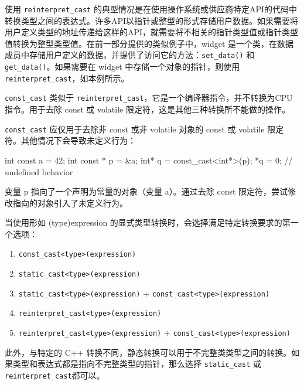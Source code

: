 使用 \verb|reinterpret_cast| 的典型情况是在使用操作系统或供应商特定API的代码中转换类型之间的表达式。许多API以指针或整型的形式存储用户数据。如果需要将用户定义类型的地址传递给这样的API，就需要将不相关的指针类型值或指针类型值转换为整型类型值。在前一部分提供的类似例子中，widget 是一个类，在数据成员中存储用户定义的数据，并提供了访问它的方法：\verb|set_data()| 和 \verb|get_data()|。如果需要在 widget 中存储一个对象的指针，则使用 \verb|reinterpret_cast|，如本例所示。

\verb|const_cast| 类似于 \verb|reinterpret_cast|，它是一个编译器指令，并不转换为CPU指令。用于去除 const 或 volatile 限定符，这是其他三种转换所不能做的操作。

\begin{myTip}
\verb|const_cast| 应仅用于去除非 const 或非 volatile 对象的 const 或 volatile 限定符。其他情况下会导致未定义行为：

\begin{cpp}
int const a = 42;
int const * p = &a;
int* q = const_cast<int*>(p);
*q = 0; // undefined behavior
\end{cpp}

变量 p 指向了一个声明为常量的对象（变量 a）。通过去除 const 限定符，尝试修改指向的对象引入了未定义行为。
\end{myTip}


当使用形如 (type)expression 的显式类型转换时，会选择满足特定转换要求的第一个选项：

\begin{enumerate}
\item
\verb|const_cast<type>(expression)|

\item
\verb|static_cast<type>(expression)|

\item
\verb|static_cast<type>(expression)| + \verb|const_cast<type>(expression)|

\item
\verb|reinterpret_cast<type>(expression)|

\item
\verb|reinterpret_cast<type>(expression)| + \verb|const_cast<type>(expression)|
\end{enumerate}

此外，与特定的 C++ 转换不同，静态转换可以用于不完整类类型之间的转换。如果类型和表达式都是指向不完整类型的指针，那么选择 \verb|static_cast| 或 \verb|reinterpret_cast|都可以。



